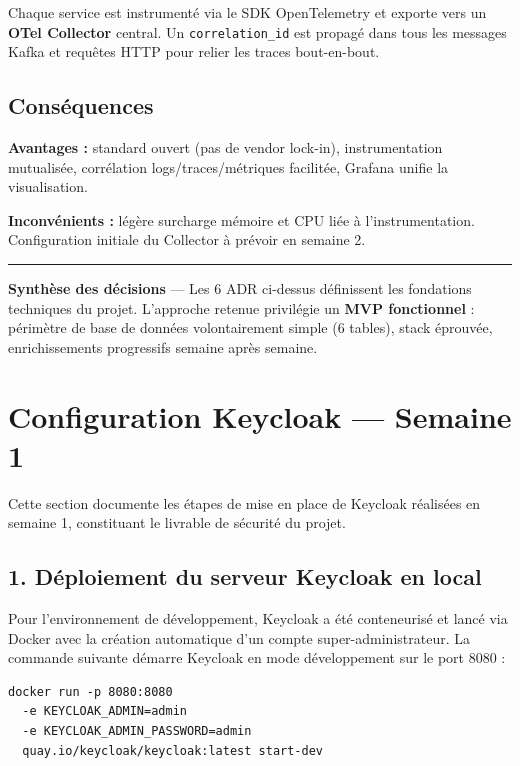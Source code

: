 \documentclass[10pt,a4paper]{article}
\newcommand{\ruledline}{\textcolor{rule}{\rule{\linewidth}{0.4pt}}\vspace{4pt}}
\begin{document}
\vspace{4pt}
Chaque service est instrumenté via le SDK OpenTelemetry et exporte vers un \textbf{OTel Collector} central. Un \texttt{correlation\_id} est propagé dans tous les messages Kafka et requêtes HTTP pour relier les traces bout-en-bout.

\subsection{Conséquences}
\textbf{Avantages :} standard ouvert (pas de vendor lock-in), instrumentation mutualisée, corrélation logs/traces/métriques facilitée, Grafana unifie la visualisation.

\noindent\textbf{Inconvénients :} légère surcharge mémoire et CPU liée à l'instrumentation. Configuration initiale du Collector à prévoir en semaine 2.

\vspace{8pt}
\ruledline
{\small\color{muted}
\textbf{Synthèse des décisions} --- Les 6 ADR ci-dessus définissent les fondations techniques du projet. L'approche retenue privilégie un \textbf{MVP fonctionnel} : périmètre de base de données volontairement simple (6 tables), stack éprouvée, enrichissements progressifs semaine après semaine.
}

\newpage

\section{Configuration Keycloak --- Semaine 1}

Cette section documente les étapes de mise en place de Keycloak réalisées en semaine 1, constituant le livrable de sécurité du projet.

\subsection{1. Déploiement du serveur Keycloak en local}

Pour l'environnement de développement, Keycloak a été conteneurisé et lancé via Docker avec la création automatique d'un compte super-administrateur. La commande suivante démarre Keycloak en mode développement sur le port 8080 :

\begin{verbatim}
docker run -p 8080:8080
  -e KEYCLOAK_ADMIN=admin
  -e KEYCLOAK_ADMIN_PASSWORD=admin
  quay.io/keycloak/keycloak:latest start-dev
\end{verbatim}
\end{document}
